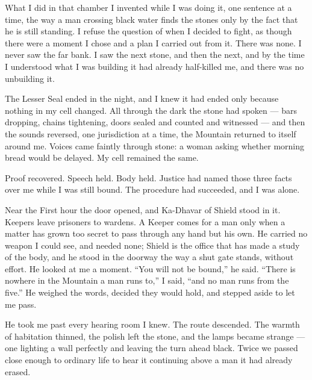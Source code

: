
\ornament

What I did in that chamber I invented while I was doing it, one sentence at a time, the way a man crossing black water finds the stones only by the fact that he is still standing. I refuse the question of when I decided to fight, as though there were a moment I chose and a plan I carried out from it. There was none. I never saw the far bank. I saw the next stone, and then the next, and by the time I understood what I was building it had already half-killed me, and there was no unbuilding it.\par
 
\ornament

 
The Lesser Seal ended in the night, and I knew it had ended only because nothing in my cell changed. All through the dark the stone had spoken --- bars dropping, chains tightening, doors sealed and counted and witnessed --- and then the sounds reversed, one jurisdiction at a time, the Mountain returned to itself around me. Voices came faintly through stone: a woman asking whether morning bread would be delayed. My cell remained the same.\par
 
Proof recovered. Speech held. Body held. Justice had named those three facts over me while I was still bound. The procedure had succeeded, and I was alone.\par
 
Near the First hour the door opened, and Ka-Dhavar of Shield stood in it. Keepers leave prisoners to wardens. A Keeper comes for a man only when a matter has grown too secret to pass through any hand but his own. He carried no weapon I could see, and needed none; Shield is the office that has made a study of the body, and he stood in the doorway the way a shut gate stands, without effort. He looked at me a moment. ``You will not be bound,'' he said. ``There is nowhere in the Mountain a man runs to,'' I said, ``and no man runs from the five.'' He weighed the words, decided they would hold, and stepped aside to let me pass.\par
 
He took me past every hearing room I knew. The route descended. The warmth of habitation thinned, the polish left the stone, and the lamps became strange --- one lighting a wall perfectly and leaving the turn ahead black. Twice we passed close enough to ordinary life to hear it continuing above a man it had already erased.\par
 

